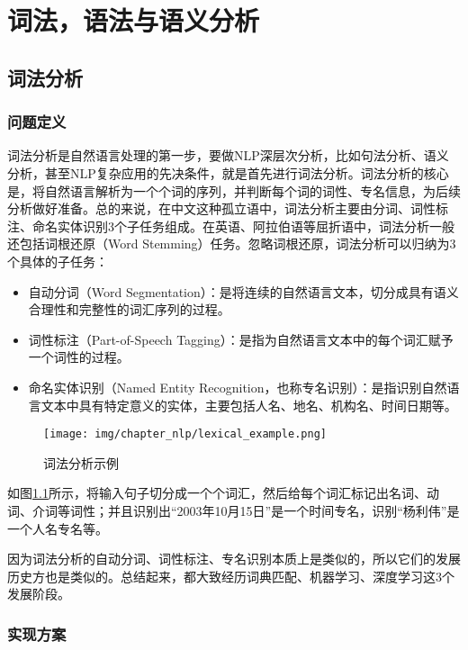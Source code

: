 
\chapter{词法，语法与语义分析}
\label{basic} %

\section{词法分析}
\subsection{问题定义}
词法分析是自然语言处理的第一步，要做NLP深层次分析，比如句法分析、语义分析，甚至NLP复杂应用的先决条件，就是首先进行词法分析。词法分析的核心是，将自然语言解析为一个个词的序列，并判断每个词的词性、专名信息，为后续分析做好准备。总的来说，在中文这种孤立语中，词法分析主要由分词、词性标注、命名实体识别3个子任务组成。在英语、阿拉伯语等屈折语中，词法分析一般还包括词根还原（Word Stemming）任务。忽略词根还原，词法分析可以归纳为3个具体的子任务：

\begin{itemize}
\item 自动分词（Word Segmentation）：是将连续的自然语言文本，切分成具有语义合理性和完整性的词汇序列的过程。
\item 词性标注（Part-of-Speech Tagging）：是指为自然语言文本中的每个词汇赋予一个词性的过程。
\item 命名实体识别（Named Entity Recognition，也称专名识别）：是指识别自然语言文本中具有特定意义的实体，主要包括人名、地名、机构名、时间日期等。
\end{itemize}

\begin{figure}[h!]
\centering
\texttt{[image: img/chapter\_nlp/lexical\_example.png]}
\caption{词法分析示例}
\label{fig:lexical_example}
\end{figure}

如图\ref{fig:lexical_example}所示，将输入句子切分成一个个词汇，然后给每个词汇标记出名词、动词、介词等词性；并且识别出“2003年10月15日”是一个时间专名，识别“杨利伟”是一个人名专名等。

因为词法分析的自动分词、词性标注、专名识别本质上是类似的，所以它们的发展历史方也是类似的。总结起来，都大致经历词典匹配、机器学习、深度学习这3个发展阶段。

\subsection{实现方案}

